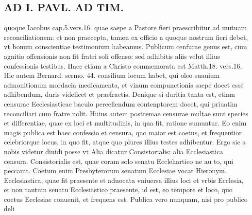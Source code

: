 \documentclass{article}
\begin{document}
\begin{pages}
\section*{AD I. PAVL. AD TIM. }
\marginpar{[ p.320 ]}\pstart quoque Iacobus cap.5.vers.16. quae saepe a Pastore fieri praescribitur ad mutuam reconciliationem: et non praecepta, tamen ex officio a quoque nostrum fieri debet, vt bonum conscientiae testimonium habeamus. Publicum cenfurae genus est, cum agnitio offensionis non fit fratri soli offenso: sed adhibitis aliis velut illius confessionis testibus. Haec etiam a Christo commemorata est Matth.18. vers.16. Hie autem Bernard. sermo. 44. consilium locum habet, qui oleo suauium admonitionum mordacia medicamenta, et vinum compunctionis saepe docet esse adhibendum, duris videlicet et praefractis. Denique si duritia tanta est, etiam censurae Ecclesiasticae baculo percellendum contenptorem docet, qui priuatim reconciliari cum fratre nolit. Huius autem postremae censurae multae sunt species et differentiae, quae ex loci et multitudinis, in qua fit, ratione sumuntur. Eo enim magis publica est haec confessio et censura, quo maior est coetus, et frequentior celebriorque locus, in quo fit, atque quo plures illius testes adhibentur. Ergo sic a nobis videtur diuidi posse vt Alia dicatur Consistorialis: alia Ecclesiastica censura. Consistorialis est, quae coram solo senatu Ecclehartieo ne au to, qui peccauit. Coetum enim Presbyterorum senatum Ecclesiae vocat Hieronym. Ecclesiastica, quae fit praesente et aduocata vniuersa illius loci et vrbis Ecclesia, et non tantum senatu Ecclesiastico praesente, id est, eo tempore et loco, quo coetus Ecclesiae conuenit, et frequens est. Publica vero nunquam, nisi pro publico deli\pend

\end{pages}
\end{document}
